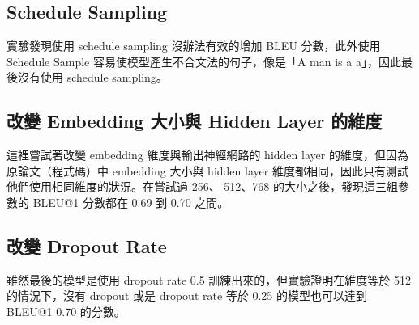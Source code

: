 \documentclass[fleqn,a4paper,12pt]{article}
\begin{document}
\subsection{Schedule Sampling}

實驗發現使用 schedule sampling 沒辦法有效的增加 BLEU 分數，此外使用 Schedule Sample 容易使模型產生不合文法的句子，像是「A man is a a」，因此最後沒有使用 schedule sampling。

\subsection{改變 Embedding 大小與 Hidden Layer 的維度}

這裡嘗試著改變 embedding 維度與輸出神經網路的 hidden layer 的維度，但因為原論文（程式碼）中 embedding 大小與 hidden layer 維度都相同，因此只有測試他們使用相同維度的狀況。在嘗試過 256、 512、768 的大小之後，發現這三組參數的 BLEU@1 分數都在 0.69 到 0.70 之間。 

\subsection{改變 Dropout Rate}

雖然最後的模型是使用 dropout rate 0.5 訓練出來的，但實驗證明在維度等於 512 的情況下，沒有 dropout 或是 dropout rate 等於 0.25 的模型也可以達到 BLEU@1 0.70 的分數。



\end{document}
